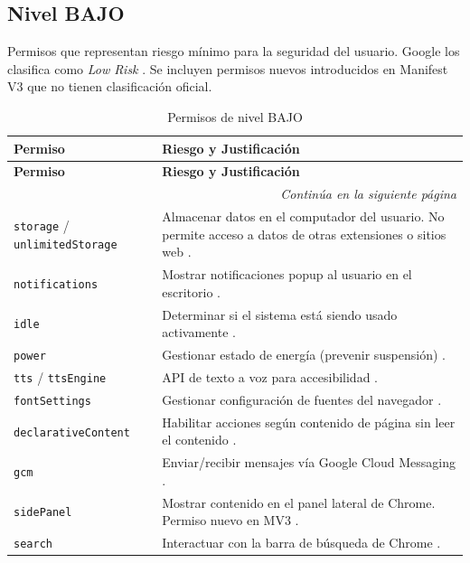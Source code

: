 \documentclass[12pt,oneside]{report}
\begin{document}
\subsection{Nivel BAJO}

Permisos que representan riesgo mínimo para la seguridad del usuario. Google los clasifica como \textit{Low Risk} \cite{google_permission_risk}. Se incluyen permisos nuevos introducidos en Manifest V3 que no tienen clasificación oficial.

{\small
\begin{longtable}{|p{4.5cm}|p{11cm}|}
\hline
\textbf{Permiso} & \textbf{Riesgo y Justificación} \\
\hline
\endfirsthead
\hline
\textbf{Permiso} & \textbf{Riesgo y Justificación} \\
\hline
\endhead
\hline
\multicolumn{2}{|r|}{\textit{Continúa en la siguiente página}} \\
\hline
\endfoot
\hline
\caption{Permisos de nivel BAJO}
\label{tab:low_permissions}
\endlastfoot
\texttt{storage} / \texttt{unlimitedStorage} & Almacenar datos en el computador del usuario. No permite acceso a datos de otras extensiones o sitios web \cite{google_permission_risk}. \\
\hline
\texttt{notifications} & Mostrar notificaciones popup al usuario en el escritorio \cite{google_permission_risk}. \\
\hline
\texttt{idle} & Determinar si el sistema está siendo usado activamente \cite{google_permission_risk}. \\
\hline
\texttt{power} & Gestionar estado de energía (prevenir suspensión) \cite{google_permission_risk}. \\
\hline
\texttt{tts} / \texttt{ttsEngine} & API de texto a voz para accesibilidad \cite{google_permission_risk}. \\
\hline
\texttt{fontSettings} & Gestionar configuración de fuentes del navegador \cite{google_permission_risk}. \\
\hline
\texttt{declarativeContent} & Habilitar acciones según contenido de página sin leer el contenido \cite{google_permission_risk}. \\
\hline
\texttt{gcm} & Enviar/recibir mensajes vía Google Cloud Messaging \cite{google_permission_risk}. \\
\hline
\texttt{sidePanel} & Mostrar contenido en el panel lateral de Chrome. Permiso nuevo en MV3 \cite{chrome_permissions_list}. \\
\hline
\texttt{search} & Interactuar con la barra de búsqueda de Chrome \cite{chrome_permissions_list}. \\

\end{longtable}}
\end{document}
